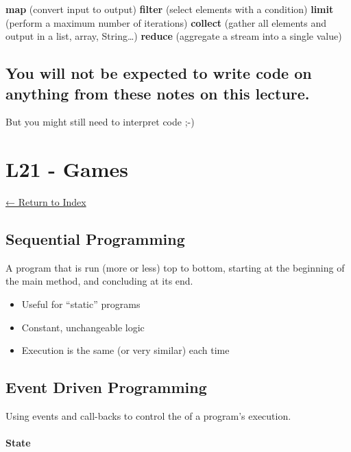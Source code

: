 \documentclass[]{article}
\providecommand{\tightlist}{%
  \setlength{\itemsep}{0pt}\setlength{\parskip}{0pt}}
\let\oldparagraph\paragraph
\renewcommand{\paragraph}[1]{\oldparagraph{#1}\mbox{}}
\begin{document}
\textbf{map} (convert input to output) \textbf{filter} (select elements
with a condition) \textbf{limit} (perform a maximum number of
iterations) \textbf{collect} (gather all elements and output in a list,
array, String\ldots{}) \textbf{reduce} (aggregate a stream into a single
value)

\hypertarget{you-will-not-be-expected-to-write-code-on-anything-from-these-notes-on-this-lecture.}{%
\subsection{You will not be expected to write code on anything from
these notes on this
lecture.}\label{you-will-not-be-expected-to-write-code-on-anything-from-these-notes-on-this-lecture.}}

But you might still need to interpret code ;-)

\hypertarget{l21---games}{%
\section{L21 - Games}\label{l21---games}}

\protect\hyperlink{table-of-contents}{← Return to Index}

\hypertarget{sequential-programming}{%
\subsection{Sequential Programming}\label{sequential-programming}}

A program that is run (more or less) top to bottom, starting at the
beginning of the main method, and concluding at its end.

\begin{itemize}
\tightlist
\item
  Useful for ``static'' programs
\item
  Constant, unchangeable logic
\item
  Execution is the same (or very similar) each time
\end{itemize}

\hypertarget{event-driven-programming}{%
\subsection{Event Driven Programming}\label{event-driven-programming}}

Using events and call-backs to control the of a program's execution.

\hypertarget{state}{%
\paragraph{State}\label{state}}
\end{document}

